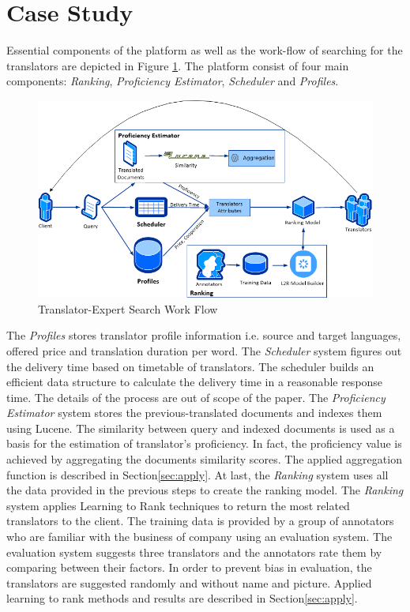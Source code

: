 \section{Case Study}
\label{sec:casestudy}
Essential components of the platform as well as the work-flow of searching for the translators are depicted in Figure \ref{fig:architecture}. The platform consist of four main components: \textit{Ranking}, \textit{Proficiency Estimator}, \textit{Scheduler} and \textit{Profiles}.

\begin{figure}[h]
\begin{center}
\includegraphics[scale=0.8]{figures/dataflow.png}
\caption{Translator-Expert Search Work Flow
\label{fig:architecture}}
\end{center}
\end{figure}

The \textit{Profiles} stores translator profile information i.e. source and target languages, offered price and translation duration per word. The \textit{Scheduler} system figures out the delivery time based on timetable of translators. The scheduler builds an efficient data structure to calculate the delivery time in a reasonable response time. The details of the process are out of scope of the paper. The \textit{Proficiency Estimator} system stores the previous-translated documents and indexes them using Lucene. The similarity between query and indexed documents is used as a basis for the estimation of translator's proficiency. In fact, the proficiency value is achieved by aggregating the documents similarity scores. The applied aggregation function is described in Section\ref{sec:apply}. At last, the \textit{Ranking} system uses all the data provided in the previous steps to create the ranking model. The \textit{Ranking} system applies Learning to Rank techniques to return the most related translators to the client. The training data is provided by a group of annotators who are familiar with the business of company using an evaluation system. The evaluation system suggests three translators and the annotators rate them by comparing between their factors. In order to prevent bias in evaluation, the translators are suggested randomly and without name and picture. Applied learning to rank methods and results are described in Section\ref{sec:apply}. 


